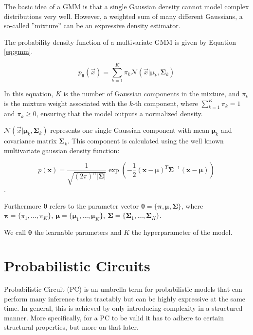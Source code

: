 The basic idea of a GMM is that a single Gaussian density cannot model complex distributions very well.
However, a weighted sum of many different Gaussians, a so-called ''mixture'' can be an expressive density estimator.

The probability density function of a multivariate GMM is given by Equation \ref{eq:gmm}.

\begin{equation}
    p_{\boldsymbol{\theta}}(\vec x) =  \sum_{k=1}^K \pi_k \mathcal{N}(\vec x|\boldsymbol{\mu}_k, \boldsymbol{\Sigma}_k) 
    \label{eq:gmm}
\end{equation}

In this equation, $K$ is the number of Gaussian components in the mixture, and $\pi_k$ is the mixture weight associated with the $k$-th component, where $\sum_{k=1}^K \pi_k = 1$ and $\pi_k \geq 0$, ensuring that the model 
outputs a normalized density. 

$\mathcal{N}(\vec x|\boldsymbol{\mu}_k, \boldsymbol{\Sigma}_k)$ represents one single Gaussian component with mean $\boldsymbol{\mu}_k$ and 
covariance matrix $\boldsymbol{\Sigma}_k$. This component is calculated using the well known multivariate gaussian density function:

\begin{equation}
    p(\mathbf{x}) = \frac{1}{\sqrt{(2\pi)^n |\boldsymbol{\Sigma}|}} \exp\left(-\frac{1}{2} (\mathbf{x} - \boldsymbol{\mu})^T \boldsymbol{\Sigma}^{-1} (\mathbf{x} - \boldsymbol{\mu})\right)
\end{equation}. 

Furthermore $\boldsymbol{\theta}$ refers to the parameter vector $\boldsymbol{\theta} = \{\boldsymbol{\pi}, \boldsymbol{\mu}, \boldsymbol{\Sigma}\}$, where $\boldsymbol{\pi} = \{ \pi_1, ... , \pi_K \}, \ \boldsymbol{\mu} = \{ \boldsymbol{\mu}_1, ... , \boldsymbol{\mu}_K \}, \ \boldsymbol{\Sigma} = \{ \boldsymbol{\Sigma}_1, ... , \boldsymbol{\Sigma}_K \}$.

We call $\boldsymbol{\theta}$ the learnable parameters and $K$ the hyperparameter of the model.

\section{Probabilistic Circuits}
\label{sec:pc}

Probabilistic Circuit (PC) \cite{pc_intro} is an umbrella term for probabilistic models that can perform many inference tasks tractably but can be 
highly expressive at the same time. In general, this is achieved by only introducing complexity in a structured manner. More specifically,
for a PC to be valid it has to adhere to certain structural properties, but more on that later. \\

